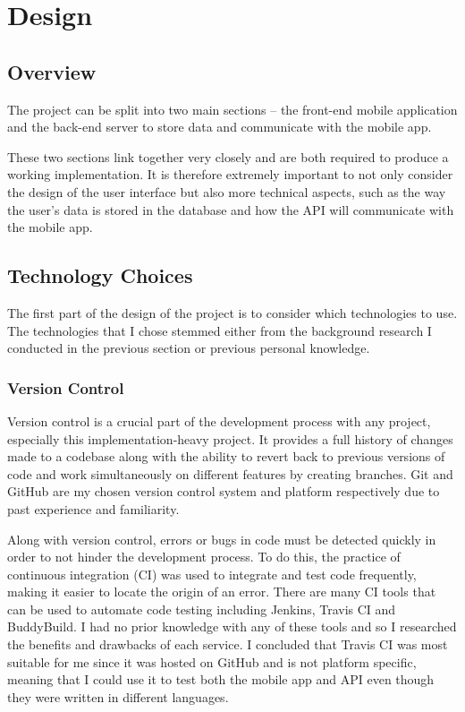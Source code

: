 \chapter{Design}

\section{Overview}

The project can be split into two main sections -- the front-end mobile application and the back-end server to store data and communicate with the mobile app.

These two sections link together very closely and are both required to produce a working implementation. It is therefore extremely important to not only consider the design of the user interface but also more technical aspects, such as the way the user's data is stored in the database and how the API will communicate with the mobile app.

\section{Technology Choices}

The first part of the design of the project is to consider which technologies to use. The technologies that I chose stemmed either from the background research I conducted in the previous section or previous personal knowledge.



\subsection{Version Control}

Version control is a crucial part of the development process with any project, especially this implementation-heavy project. It provides a full history of changes made to a codebase along with the ability to revert back to previous versions of code and work simultaneously on different features by creating branches. Git and GitHub are my chosen version control system and platform respectively due to past experience and familiarity.

Along with version control, errors or bugs in code must be detected quickly in order to not hinder the development process. To do this, the practice of continuous integration (CI) was used to integrate and test code frequently, making it easier to locate the origin of an error. There are many CI tools that can be used to automate code testing including Jenkins, Travis CI and BuddyBuild. I had no prior knowledge with any of these tools and so I researched the benefits and drawbacks of each service. I concluded that Travis CI was most suitable for me since it was hosted on GitHub and is not platform specific, meaning that I could use it to test both the mobile app and API even though they were written in different languages.

